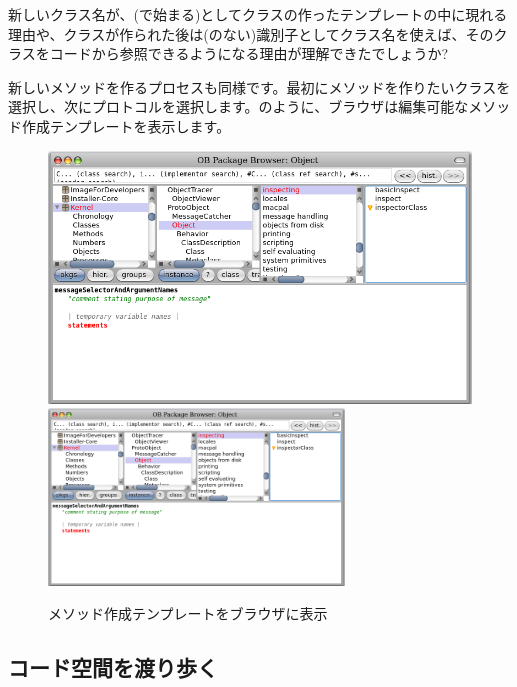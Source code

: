 \documentclass[a4paper,10pt,twoside]{book}
\begin{document}

新しいクラス名が、(\ie \ct{#}で始まる)としてクラスの作ったテンプレートの中に現れる理由や、クラスが作られた後は(\ie \ct{#}のない)識別子としてクラス名を使えば、そのクラスをコードから参照できるようになる理由が理解できたでしょうか?

新しいメソッドを作るプロセスも同様です。最初にメソッドを作りたいクラスを選択し、次にプロトコルを選択します。のように、ブラウザは編集可能なメソッド作成テンプレートを表示します。

\begin{figure}[htbp]
   \centering
   \ifluluelse
{\includegraphics [width=\textwidth]{SystemBrowserMethodTemplate}}
{\includegraphics[width=0.7\textwidth]{SystemBrowserMethodTemplate}}
   \caption{メソッド作成テンプレートをブラウザに表示
   }
\end{figure}

\subsection{コード空間を渡り歩く}
\end{document}
